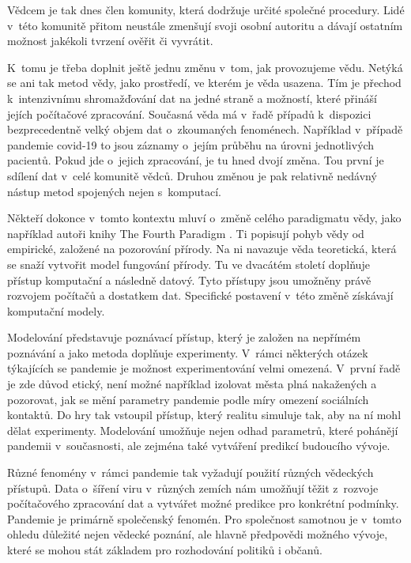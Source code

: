 Vědcem je tak dnes člen komunity, která dodržuje určité společné procedury. Lidé v~této komunitě přitom neustále zmenšují svoji osobní autoritu a dávají ostatním možnost jakékoli tvrzení ověřit či vyvrátit.

K~tomu je třeba doplnit ještě jednu změnu v~tom, jak provozujeme vědu. Netýká se ani tak metod vědy, jako prostředí, ve kterém je věda usazena. Tím je přechod k~intenzivnímu shromažďování dat na jedné straně a možností, které přináší jejích počítačové zpracování. Současná věda má v~řadě případů k~dispozici bezprecedentně velký objem dat o~zkoumaných fenoménech. Například v~případě pandemie covid-19 to jsou záznamy o~jejím průběhu na úrovni jednotlivých pacientů. Pokud jde o~jejich zpracování, je tu hned dvojí změna. Tou první je sdílení dat v~celé komunitě vědců. Druhou změnou je pak relativně nedávný nástup metod spojených nejen s~komputací.

Někteří dokonce v~tomto kontextu mluví o~změně celého paradigmatu vědy, jako například autoři knihy The Fourth Paradigm \cite{Hey2009}. Ti popisují pohyb vědy od empirické, založené na pozorování přírody. Na ni navazuje věda teoretická, která se snaží vytvořit model fungování přírody.  Tu ve dvacátém století doplňuje přístup komputační a následně datový. Tyto přístupy jsou umožněny právě rozvojem počítačů a dostatkem dat. Specifické postavení v~této změně získávají komputační modely.

Modelování představuje poznávací přístup, který je založen na nepřímém poz\-ná\-vá\-ní a jako metoda doplňuje experimenty. V~rámci některých otázek týkajících se pandemie je možnost experimentování velmi omezená. V~první řadě je zde důvod etický, není možné například izolovat města plná nakažených a pozorovat, jak se mění parametry pandemie podle míry omezení sociálních kontaktů. Do hry tak vstoupil přístup, který realitu simuluje tak, aby na ní mohl dělat experimenty. Modelování umožňuje nejen odhad parametrů, které pohánějí pandemii v~současnosti, ale zejména také vytváření predikcí budoucího vývoje.

Různé fenomény v~rámci pandemie tak vyžadují použití různých vědeckých pří\-stu\-pů. Data o~šíření viru v~různých zemích nám umožňují těžit z~rozvoje počítačového zpracování dat
a vytvářet možné predikce pro konkrétní podmínky. Pandemie je primárně společenský fenomén. Pro společnost samotnou je v~tomto ohledu důležité nejen vědecké poznání, ale hlavně předpovědi možného vývoje, které se mohou stát základem pro rozhodování politiků i občanů.

